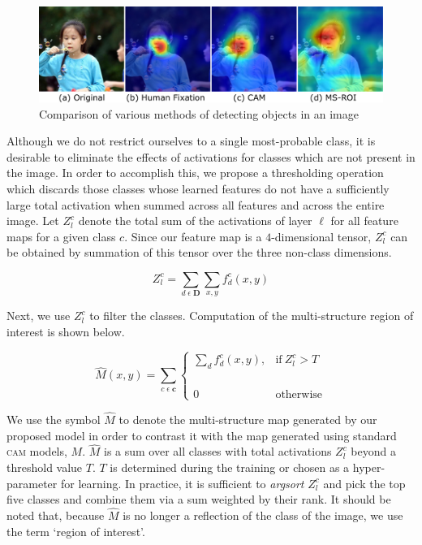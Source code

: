 \begin{figure}
    \centering
    \includegraphics[scale=0.45]{figures/semantic/girl_compression.pdf}
    \caption[MSROI vs CAM vs Saliency]{Comparison of various methods of detecting objects in an image \label{fig_comparison_of_map}}
\end{figure}

Although we do not restrict ourselves to a single most-probable class, it is desirable to eliminate the effects of activations for classes which are not present in the image.  
In order to accomplish this, we propose a thresholding operation which discards those classes whose learned features do not have a sufficiently large total activation when summed across all features and across the entire image.  
Let $Z^c_l$ denote the total sum of the activations of layer $\ell$ for all feature maps for a given class $c$.
Since our feature map is a $4$-dimensional tensor, $Z^c_l$ can be obtained by summation of this tensor over the three non-class dimensions.

\begin{equation}
    Z^c_l = \sum_{d \; \epsilon \; \mathbf{D}} \sum_{x,y} f_d^c(x,y)
    \label{eqn_Zscore}
\end{equation}

Next, we use $Z^c_l$ to filter the classes. Computation of the multi-structure region of interest is shown below.

\begin{equation}
    \hat{M}(x,y) = \sum_{c \; \epsilon \; \mathbf{c} }
    \begin{cases}
        \sum_d f_d^c(x,y), & \text{if}\ Z^c_l > T \\
        \phantom{this_is_empty} \\
      0 & \text{otherwise}
    \end{cases}
    \label{eqn_msroi}
\end{equation}

We use the symbol $\hat{M}$ to denote the multi-structure map generated by our proposed model in order to contrast it with the map generated using standard \textsc{cam} models, $ M $.
$ \hat{M} $ is a sum over all classes with total activations $Z^c_l$ beyond a threshold value $T$.
$T$ is determined during the training or chosen as a hyper-parameter for learning. 
In practice, it is sufficient to \textit{argsort} $Z^c_l$ and pick the top five classes and combine them via a sum weighted by their rank. 
It should be noted that, because $ \hat{M} $ is no longer a reflection of the class of the image, we use the term `region of interest'.

